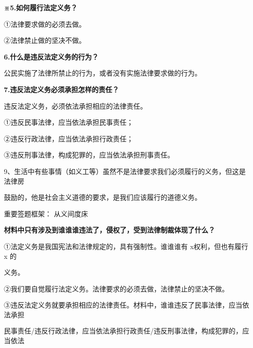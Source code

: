 \documentclass[lang=cn,11pt]{elegantbook}
\newcommand{\daofasym}[1]{{\daofasymbolfont #1}}
\newcommand{\daofasym}[1]{#1}
\begin{document}
\textbf{※5.如何履行法定义务？}\par

\daofasym{①}法律要求做的必须去做。\par

\daofasym{②}法律禁止做的坚决不做。\par

\textbf{6.什么是违反法定义务的行为？}\par

公民实施了法律所禁止的行为，或者没有实施法律要求做的行为。\par

\textbf{7.违反法定义务必须承担怎样的责任？}\par

违反法定义务，必须依法承担相应的法律责任。\par

\daofasym{①}违反民事法律，应当依法承担民事责任；\par

\daofasym{②}违反行政法律，应当依法承担行政责任；\par

\daofasym{③}违反刑事法律，构成犯罪的，应当依法承担刑事责任。\par

9、生活中有些事情（如义工等）虽然不是法律要求我们必须履行的义务，但这是法律房\par

鼓励的，他是社会主义道德的要求，是我们应该履行的道德义务。\par

重要签题框架： 从义间度床\par

\textbf{材料中只有涉及到谁谁谁违法了，侵权了，受到法律制裁体现了什么？}\par

\daofasym{①}法定义务是我国宪法和法律规定的，具有强制性。谁谁谁有 x权利，但也有履行 x 的\par

义务。\par

\daofasym{②}我们要自觉履行法定义务。法律要求的必须去做，法律禁止的坚决不做。\par

\daofasym{③}违反法定义务就要承担相应的法律责任。材料中，谁谁违反了民事法律，应当依法承担\par

民事责任/违反行政法律，应当依法承担行政责任/违反刑事法律，构成犯罪的，应当依法\par
\end{document}
